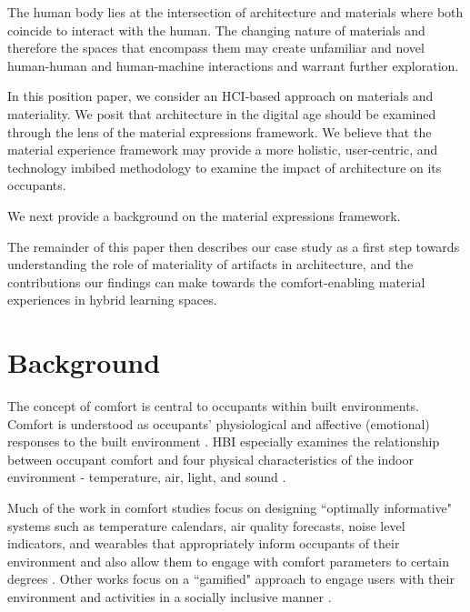\documentclass[manuscript, anonymous, review]{acmart}
\begin{document}
The human body lies at the intersection of architecture and materials where both coincide to interact with the human. The changing nature of materials and therefore the spaces that encompass them may create unfamiliar and novel human-human and human-machine interactions and warrant further exploration. %

In this position paper, we consider an HCI-based approach on materials and materiality. We posit that architecture in the digital age should be examined through the lens of the material expressions framework. We believe that the material experience framework may provide a more holistic, user-centric, and technology imbibed methodology to examine the impact of architecture on its occupants. 

We next provide a background on the material expressions framework.

The remainder of this paper then describes our case study as a first step towards understanding the role of materiality of artifacts in architecture, and the contributions our findings can make towards the comfort-enabling material experiences in hybrid learning spaces.


\section{Background}
The concept of comfort is central to occupants within built environments. Comfort is understood as occupants' physiological and affective (emotional) responses to the built environment \cite{alavi2017comfort}. HBI especially examines the relationship between occupant comfort and four physical characteristics of the indoor environment - temperature, air, light, and sound \cite{hawkes2007environmental, bluyssen2009indoor}. 

Much of the work in comfort studies focus on designing ``optimally informative" systems such as temperature calendars, air quality forecasts, noise level indicators, and wearables that appropriately inform occupants of their environment and also allow them to engage with comfort parameters to certain degrees  \cite{costanza2016bit, milenkovic2013improving, kim2020designing}. Other works focus on a ``gamified" approach to engage users with their environment and activities in a socially inclusive manner \cite{mathur2015tiny, kwallek1997impact, zhong2022augmenting}. 
\end{document}
